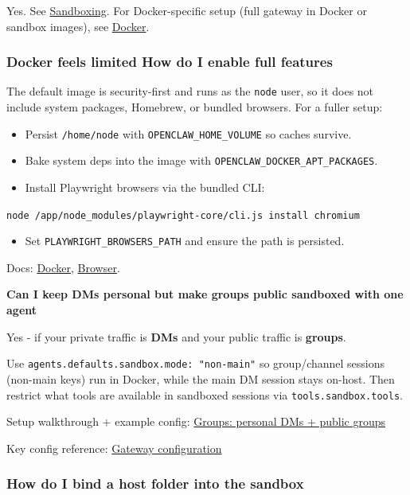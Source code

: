 Yes. See \href{/gateway/sandboxing}{Sandboxing}. For Docker-specific setup (full gateway in Docker or sandbox images), see \href{/install/docker}{Docker}.

\subsubsection{Docker feels limited How do I enable full features}


The default image is security-first and runs as the \texttt{node} user, so it does not
include system packages, Homebrew, or bundled browsers. For a fuller setup:

\begin{itemize}
  \item Persist \texttt{/home/node} with \texttt{OPENCLAW\_HOME\_VOLUME} so caches survive.
  \item Bake system deps into the image with \texttt{OPENCLAW\_DOCKER\_APT\_PACKAGES}.
  \item Install Playwright browsers via the bundled CLI:
\end{itemize}

\texttt{node /app/node\_modules/playwright-core/cli.js install chromium}
\begin{itemize}
  \item Set \texttt{PLAYWRIGHT\_BROWSERS\_PATH} and ensure the path is persisted.
\end{itemize}


Docs: \href{/install/docker}{Docker}, \href{/tools/browser}{Browser}.

\textbf{Can I keep DMs personal but make groups public sandboxed with one agent}

Yes - if your private traffic is \textbf{DMs} and your public traffic is \textbf{groups}.

Use \texttt{agents.defaults.sandbox.mode: "non-main"} so group/channel sessions (non-main keys) run in Docker, while the main DM session stays on-host. Then restrict what tools are available in sandboxed sessions via \texttt{tools.sandbox.tools}.

Setup walkthrough + example config: \href{/channels/groups\#pattern-personal-dms-public-groups-single-agent}{Groups: personal DMs + public groups}

Key config reference: \href{/gateway/configuration\#agentsdefaultssandbox}{Gateway configuration}

\subsubsection{How do I bind a host folder into the sandbox}


